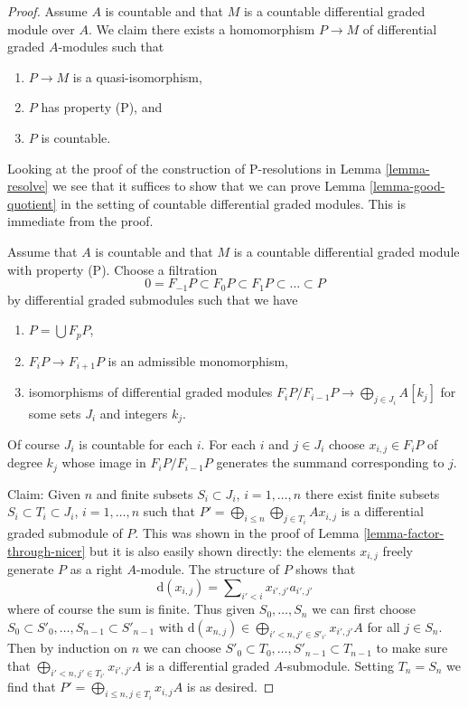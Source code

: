 \begin{proof}
\medskip\noindent
Assume $A$ is countable and that $M$ is a countable differential graded
module over $A$. We claim there exists a homomorphism
$P \to M$ of differential graded $A$-modules such that
\begin{enumerate}
\item $P \to M$ is a quasi-isomorphism,
\item $P$ has property (P), and
\item $P$ is countable.
\end{enumerate}
Looking at the proof of the construction of P-resolutions in
Lemma \ref{lemma-resolve} we see that it suffices to show that
we can prove Lemma \ref{lemma-good-quotient}
in the setting of countable differential graded modules.
This is immediate from the proof.

\medskip\noindent
Assume that $A$ is countable and that $M$ is a countable
differential graded module with property (P). Choose a filtration
$$
0 = F_{-1}P \subset F_0P \subset F_1P \subset \ldots \subset P
$$
by differential graded submodules such that we have
\begin{enumerate}
\item $P = \bigcup F_pP$,
\item $F_iP \to F_{i + 1}P$ is an admissible monomorphism,
\item isomorphisms of differential graded modules
$F_iP/F_{i - 1}P \to \bigoplus_{j \in J_i} A[k_j]$
for some sets $J_i$ and integers $k_j$.
\end{enumerate}
Of course $J_i$ is countable for each $i$. For each $i$ and
$j \in J_i$ choose $x_{i, j} \in F_iP$ of degree $k_j$ whose
image in $F_iP/F_{i - 1}P$ generates the summand corresponding
to $j$.

\medskip\noindent
Claim: Given $n$ and finite subsets $S_i \subset J_i$, $i = 1, \ldots, n$
there exist finite subsets $S_i \subset T_i \subset J_i$, $i = 1, \ldots, n$
such that $P' = \bigoplus_{i \leq n} \bigoplus_{j \in T_i} Ax_{i, j}$
is a differential graded submodule of $P$. This was shown in the
proof of Lemma \ref{lemma-factor-through-nicer} but it is also
easily shown directly: the elements $x_{i, j}$ freely generate
$P$ as a right $A$-module. The structure of $P$ shows that
$$
\text{d}(x_{i, j}) = \sum\nolimits_{i' < i} x_{i', j'}a_{i', j'}
$$
where of course the sum is finite.
Thus given $S_0, \ldots, S_n$ we can first choose
$S_0 \subset S'_0, \ldots, S_{n - 1} \subset S'_{n - 1}$ with
$\text{d}(x_{n, j}) \in \bigoplus_{i' < n, j' \in S'_{i'}} x_{i', j'}A$
for all $j \in S_n$. Then by induction on $n$ we can choose
$S'_0 \subset T_0, \ldots, S'_{n - 1} \subset T_{n - 1}$
to make sure that $\bigoplus_{i' < n, j' \in T_{i'}} x_{i', j'}A$
is a differential graded $A$-submodule. Setting $T_n = S_n$ we find that
$P' = \bigoplus_{i \leq n, j \in T_i} x_{i, j}A$ is as desired.


\end{proof}

